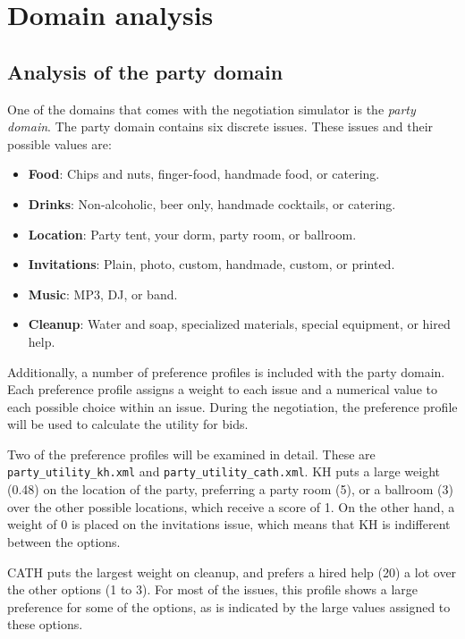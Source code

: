 \chapter{Domain analysis}

\section{Analysis of the party domain}


One of the domains that comes with the negotiation simulator is the \emph{party domain}.
The party domain contains six discrete issues.
These issues and their possible values are:
\begin{itemize}
\item \textbf{Food}: Chips and nuts, finger-food, handmade food, or catering.
\item \textbf{Drinks}: Non-alcoholic, beer only, handmade cocktails, or catering.
\item \textbf{Location}: Party tent, your dorm, party room, or ballroom.
\item \textbf{Invitations}: Plain, photo, custom, handmade, custom, or printed.
\item \textbf{Music}: MP3, DJ, or band.
\item \textbf{Cleanup}: Water and soap, specialized materials, special equipment, or hired help.
\end{itemize}
Additionally, a number of preference profiles is included with the party domain.
Each preference profile assigns a weight to each issue and a numerical value to each possible choice within an issue.
During the negotiation, the preference profile will be used to calculate the utility for bids.

Two of the preference profiles will be examined in detail.
These are \texttt{party\_utility\_kh.xml} and \texttt{party\_utility\_cath.xml}.
KH puts a large weight (0.48) on the location of the party, preferring a party room (5), or a ballroom (3) over the other possible locations, which receive a score of 1.
On the other hand, a weight of 0 is placed on the invitations issue, which means that KH is indifferent between the options.

CATH puts the largest weight on cleanup, and prefers a hired help (20) a lot over the other options (1 to 3).
For most of the issues, this profile shows a large preference for some of the options, as is indicated by the large values assigned to these options.

